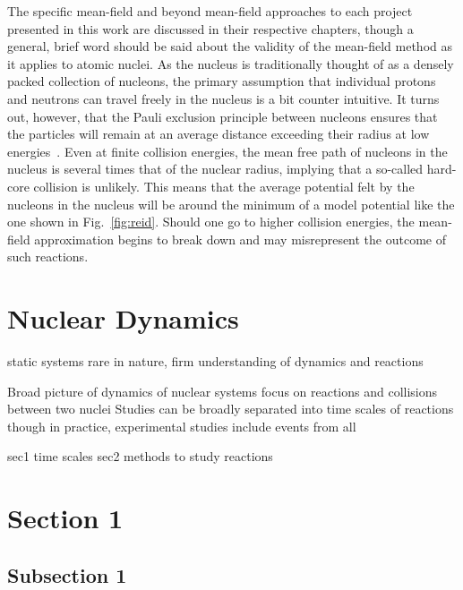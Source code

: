 The specific mean-field and beyond mean-field approaches to each project presented in this work are discussed in their respective chapters, though a general, brief word should be said about the validity of the mean-field method as it applies to atomic nuclei.
As the nucleus is traditionally thought of as a densely packed collection of nucleons, the primary assumption that individual protons and neutrons can travel freely in the nucleus is a bit counter intuitive.
It turns out, however, that the Pauli exclusion principle between nucleons ensures that the particles will remain at an average distance exceeding their radius at low energies~\citep{ring1980}.
Even at finite collision energies, the mean free path of nucleons in the nucleus is several times that of the nuclear radius, implying that a so-called hard-core collision is unlikely.
This means that the average potential felt by the nucleons in the nucleus will be around the minimum of a model potential like the one shown in Fig.~\ref{fig:reid}.
Should one go to higher collision energies, the mean-field approximation begins to break down and may misrepresent the outcome of such reactions.

\section{Nuclear Dynamics}

static systems rare in nature, firm understanding of dynamics and reactions

Broad picture of dynamics of nuclear systems
focus on reactions and collisions between two nuclei
Studies can be broadly separated into time scales of reactions
though in practice, experimental studies include events from all

sec1 time scales
sec2 methods to study reactions




\section{Section 1}\label{sec:ch_1_sec_1}

\subsection{Subsection 1}\label{subsec:subsec_1.1.1}


\clearpage
